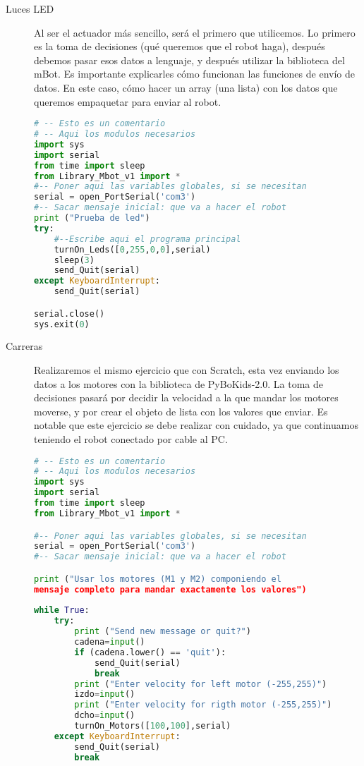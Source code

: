 \begin{description}
	\item [Luces LED] Al ser el actuador más sencillo, será el primero que utilicemos. Lo primero es la toma de decisiones (qué queremos que el robot haga), después debemos pasar esos datos a lenguaje, y después utilizar la biblioteca del mBot. Es importante explicarles cómo funcionan las funciones de envío de datos. En este caso, cómo hacer un array (una lista) con los datos que queremos empaquetar para enviar al robot.
\begin{lstlisting}[language=python,caption={Solución de referencia del ejercicio de las luces LED para Python}]
# -- Esto es un comentario		
# -- Aqui los modulos necesarios
import sys
import serial
from time import sleep
from Library_Mbot_v1 import *
#-- Poner aqui las variables globales, si se necesitan
serial = open_PortSerial('com3')
#-- Sacar mensaje inicial: que va a hacer el robot
print ("Prueba de led")
try:
	#--Escribe aqui el programa principal
	turnOn_Leds([0,255,0,0],serial)
	sleep(3)
	send_Quit(serial)
except KeyboardInterrupt:
	send_Quit(serial)

serial.close()
sys.exit(0)
\end{lstlisting}
	\item [Carreras] Realizaremos el mismo ejercicio que con Scratch, esta vez enviando los datos a los motores con la biblioteca de PyBoKids-2.0. La toma de decisiones pasará por decidir la velocidad a la que mandar los motores moverse, y por crear el objeto de lista con los valores que enviar. Es notable que este ejercicio se debe realizar con cuidado, ya que continuamos teniendo el robot conectado por cable al PC.
\begin{lstlisting}[language=python,caption={Solución para el ejercicio de carreras en Python}]
# -- Esto es un comentario		
# -- Aqui los modulos necesarios
import sys
import serial
from time import sleep
from Library_Mbot_v1 import *

#-- Poner aqui las variables globales, si se necesitan
serial = open_PortSerial('com3')
#-- Sacar mensaje inicial: que va a hacer el robot

print ("Usar los motores (M1 y M2) componiendo el 
mensaje completo para mandar exactamente los valores")
	
while True:
	try:
		print ("Send new message or quit?")
		cadena=input()
		if (cadena.lower() == 'quit'):
			send_Quit(serial)
			break
		print ("Enter velocity for left motor (-255,255)")
		izdo=input()
		print ("Enter velocity for rigth motor (-255,255)")
		dcho=input()	
		turnOn_Motors([100,100],serial)
	except KeyboardInterrupt:
		send_Quit(serial)
		break
	

\end{lstlisting}
\end{description}
